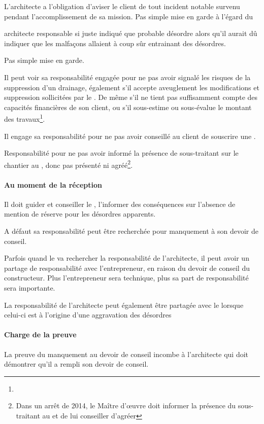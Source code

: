 		L’architecte a l’obligation d’aviser le client de tout incident notable survenu pendant l’accomplissement de sa mission. Pas simple mise en garde à l’égard du \Mo
		\begin{exemple}
			architecte responsable si juste indiqué que probable désordre alors qu’il aurait dû indiquer que les malfaçons allaient à coup sûr entrainant des désordres.
		\end{exemple}

		Pas simple mise en garde.


		Il peut voir sa responsabilité engagée pour ne pas avoir signalé les risques de la suppression d’un drainage, également s’il accepte aveuglement les modifications et suppression sollicitées par le \Mo. De même s’il ne tient pas suffisamment compte des capacités financières de son client, ou s’il sous-estime ou sous-évalue le montant des travaux\footnote{}.

		Il engage sa responsabilité pour ne pas avoir conseillé au client de souscrire une \DO.

		Responsabilité pour ne pas avoir informé la présence de sous-traitant sur le chantier au \Mo, donc pas présenté ni agréé\footnote{Dans un arrêt de 2014, \CourDeCas le Maître d’œuvre doit informer la présence du sous-traitant au \Mo et de lui conseiller d’agréer}.


		\paragraph{Au moment de la réception}
Il doit guider et conseiller le \Mo, l’informer des conséquences sur l’absence de mention de réserve pour les désordres apparents.


		A défaut sa responsabilité peut être recherchée pour manquement à son devoir de conseil.


		Parfois quand le \Mo va rechercher la responsabilité de l’architecte, il peut avoir un partage de responsabilité avec l’entrepreneur, en raison du devoir de conseil du constructeur. Plus l’entrepreneur sera technique, plus sa part de responsabilité sera importante.


		La responsabilité de l’architecte peut également être partagée avec le \Mo lorsque celui-ci est à l’origine d’une aggravation des désordres


		\paragraph{Charge de la preuve} La preuve du manquement au devoir de conseil incombe à l’architecte qui doit démontrer qu’il a rempli son devoir de conseil.

